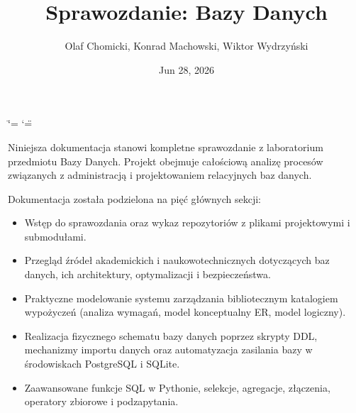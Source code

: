 \documentclass[a4paper,11pt,english,openany,oneside]{sphinxmanual}
\title{Sprawozdanie: Bazy Danych}
\date{Jun 28, 2026}
\author{Olaf Chomicki, Konrad Machowski, Wiktor Wydrzyński}
\begin{document}
\ifdefined\shorthandoff
  \ifnum\catcode`\=\string=\active\shorthandoff{=}\fi
  \ifnum\catcode`\"=\active{}\fi
\fi

\pagestyle{empty}
\sphinxmaketitle
\pagestyle{plain}
\sphinxtableofcontents
\pagestyle{normal}
\label{\detokenize{index::doc}}


\sphinxAtStartPar
Niniejsza dokumentacja stanowi kompletne sprawozdanie z laboratorium przedmiotu Bazy Danych. Projekt obejmuje całościową analizę procesów związanych z administracją i projektowaniem relacyjnych baz danych.

\sphinxAtStartPar
Dokumentacja została podzielona na pięć głównych sekcji:
\begin{itemize}
\item {} 
\sphinxAtStartPar
{} Wstęp do sprawozdania oraz wykaz repozytoriów z plikami projektowymi i submodułami.

\item {} 
\sphinxAtStartPar
{} Przegląd źródeł akademickich i naukowo\sphinxhyphen{}technicznych dotyczących baz danych, ich architektury, optymalizacji i bezpieczeństwa.

\item {} 
\sphinxAtStartPar
{} Praktyczne modelowanie systemu zarządzania bibliotecznym katalogiem wypożyczeń (analiza wymagań, model konceptualny E\sphinxhyphen{}R, model logiczny).

\item {} 
\sphinxAtStartPar
{} Realizacja fizycznego schematu bazy danych poprzez skrypty DDL, mechanizmy importu danych oraz automatyzacja zasilania bazy w środowiskach PostgreSQL i SQLite.

\item {} 
\sphinxAtStartPar
{} Zaawansowane funkcje SQL w Pythonie, selekcje, agregacje, złączenia, operatory zbiorowe i podzapytania.

\end{itemize}

\sphinxstepscope
\end{document}
